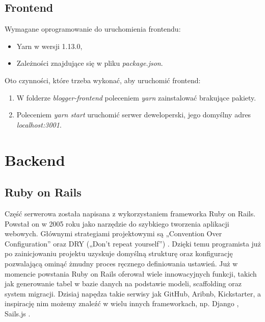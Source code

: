 \documentclass[declaration,shortabstract,polish,inz]{iithesis}
\begin{document}
\subsection{Frontend}
Wymagane oprogramowanie do uruchomienia frontendu:
    \begin{itemize}
        \item Yarn \cite{yarn} w wersji 1.13.0,
        \item Zależności znajdujące się w pliku \textit{package.json}.
    \end{itemize}

Oto czynności, które trzeba wykonać, aby uruchomić frontend:
\begin{enumerate}
    \item W folderze \textit{blogger-frontend} poleceniem \textit{yarn} zainstalować brakujące pakiety.
    \item Poleceniem \textit{yarn start} uruchomić serwer deweloperski, jego domyślny adres \textit{localhost:3001}.
\end{enumerate}

\section{Backend}
\subsection{Ruby on Rails}
Część serwerowa została napisana z wykorzystaniem frameworka Ruby on Rails. Powstał on w 2005 roku \cite{rorwiki} jako narzędzie do szybkiego tworzenia aplikacji webowych. Głównymi strategiami projektowymi są „Convention Over Configuration” \cite{coc} oraz DRY („Don’t repeat yourself”) \cite{dry}. Dzięki temu programista już po zainicjowaniu projektu uzyskuje domyślną strukturę oraz konfigurację pozwalającą ominąć żmudny proces ręcznego definiowania ustawień. Już w momencie powstania Ruby on Rails oferował wiele innowacyjnych funkcji, takich jak generowanie tabel w bazie danych na podstawie modeli, scaffolding oraz system migracji. Dzisiaj napędza takie serwisy jak GitHub, Aribnb, Kickstarter, a inspirację nim możemy znaleźć w wielu innych frameworkach, np. Django \cite{django}, Sails.js \cite{sails}.
\end{document}
